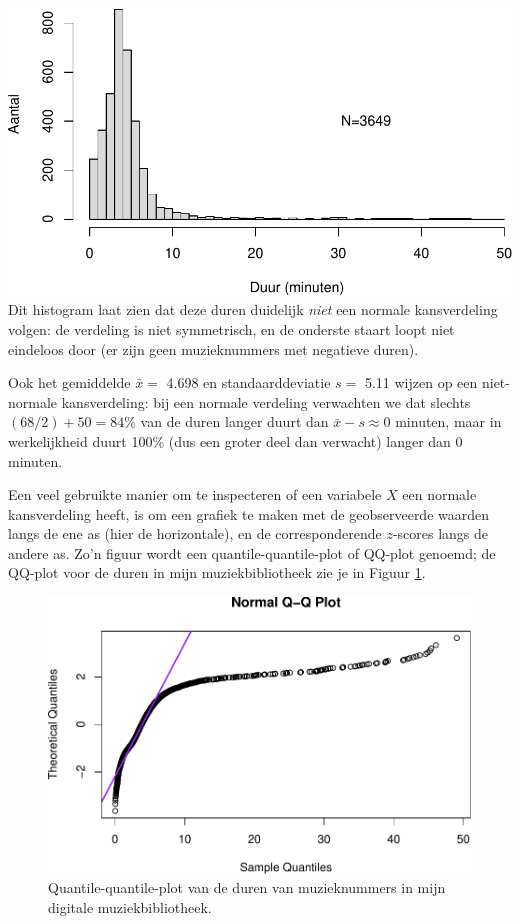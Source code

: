 \documentclass[
]{book}
\begin{document}
\includegraphics{KMS-NL_files/figure-latex/itunestimeshist-1.pdf}
Dit histogram laat zien dat deze duren
duidelijk \emph{niet} een normale kansverdeling volgen: de verdeling is niet
symmetrisch, en de onderste staart loopt niet eindeloos door (er zijn
geen muzieknummers met negatieve duren).

Ook het gemiddelde \(\bar{x} =\) 4.698 en
standaarddeviatie \(s =\) 5.11
wijzen op een niet-normale kansverdeling:
bij een normale verdeling verwachten we dat slechts \((68/2)+50=84\)\% van de duren langer duurt dan
\(\bar{x}-s\approx 0\) minuten, maar in werkelijkheid duurt 100\%
(dus een groter deel dan verwacht) langer dan 0 minuten.

Een veel gebruikte manier om te inspecteren of een variabele \(X\) een
normale kansverdeling heeft, is om een grafiek te maken met de
geobserveerde waarden langs de ene as (hier de horizontale), en de corresponderende \(z\)-scores
langs de andere as. Zo'n figuur wordt een quantile-quantile-plot of
QQ-plot genoemd; de QQ-plot voor de duren in mijn muziekbibliotheek zie
je in Figuur \ref{fig:itunestimesqqplot}.

\begin{figure}
\centering
\includegraphics{KMS-NL_files/figure-latex/itunestimesqqplot-1.pdf}
\caption{\label{fig:itunestimesqqplot}Quantile-quantile-plot van de duren van muzieknummers in mijn digitale muziekbibliotheek.}
\end{figure}
\end{document}
